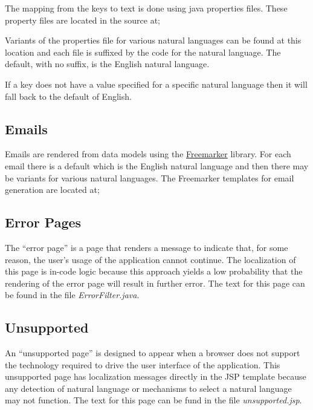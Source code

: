 The mapping from the keys to text is done using java properties files.  These property files are located in the source at;


Variants of the properties file for various natural languages can be found at this location and each file is suffixed by the code for the natural language.  The default, with no suffix, is the English natural language.

If a key does not have a value specified for a specific natural language then it will fall back to the default of English.

\subsection{Emails}

Emails are rendered from data models using the \href{http://freemarker.org/}{Freemarker} library.  For each email there is a default which is the English natural language and then there may be variants for various natural languages.  The Freemarker templates for email generation are located at;


\subsection{Error Pages}

The ``error page'' is a page that renders a message to indicate that, for some reason, the user's usage of the application cannot continue.  The localization of this page is in-code logic because this approach yields a low probability that the rendering of the error page will result in further error.  The text for this page can be found in the file {\it ErrorFilter.java}.

\subsection{Unsupported}

An ``unsupported page'' is designed to appear when a browser does not support the technology required to drive the user interface of the application.  This unsupported page has localization messages directly in the JSP template because any detection of natural language or mechanisms to select a natural language may not function.  The text for this page can be fund in the file {\it unsupported.jsp}.